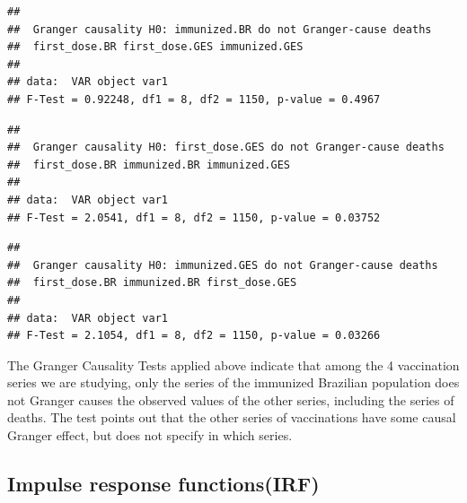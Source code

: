 \documentclass[
]{article}
\newenvironment{Shaded}{\begin{snugshade}}{\end{snugshade}}
\newcommand{\AttributeTok}[1]{\textcolor[rgb]{0.13,0.29,0.53}{#1}}
\newcommand{\CommentTok}[1]{\textcolor[rgb]{0.56,0.35,0.01}{\textit{#1}}}
\newcommand{\FunctionTok}[1]{\textcolor[rgb]{0.13,0.29,0.53}{\textbf{#1}}}
\newcommand{\NormalTok}[1]{#1}
\newcommand{\OtherTok}[1]{\textcolor[rgb]{0.56,0.35,0.01}{#1}}
\newcommand{\SpecialCharTok}[1]{\textcolor[rgb]{0.81,0.36,0.00}{\textbf{#1}}}
\newcommand{\StringTok}[1]{\textcolor[rgb]{0.31,0.60,0.02}{#1}}
\renewenvironment{Shaded}{\begin{mdframed}[ backgroundcolor=shadecolor, linecolor = shadecolor, leftmargin=\dimexpr\leftmargin-2pt\relax, innerleftmargin=1.6pt, innertopmargin=5pt, skipabove=10pt,skipbelow=3pt ]}{\end{mdframed}}
\begin{document}
\begin{verbatim}
## 
##  Granger causality H0: immunized.BR do not Granger-cause deaths
##  first_dose.BR first_dose.GES immunized.GES
## 
## data:  VAR object var1
## F-Test = 0.92248, df1 = 8, df2 = 1150, p-value = 0.4967
\end{verbatim}

\begin{Shaded}
\end{Shaded}

\begin{verbatim}
## 
##  Granger causality H0: first_dose.GES do not Granger-cause deaths
##  first_dose.BR immunized.BR immunized.GES
## 
## data:  VAR object var1
## F-Test = 2.0541, df1 = 8, df2 = 1150, p-value = 0.03752
\end{verbatim}

\begin{Shaded}
\end{Shaded}

\begin{verbatim}
## 
##  Granger causality H0: immunized.GES do not Granger-cause deaths
##  first_dose.BR immunized.BR first_dose.GES
## 
## data:  VAR object var1
## F-Test = 2.1054, df1 = 8, df2 = 1150, p-value = 0.03266
\end{verbatim}

The Granger Causality Tests applied above indicate that among the 4
vaccination series we are studying, only the series of the immunized
Brazilian population does not Granger causes the observed values of the
other series, including the series of deaths. The test points out that
the other series of vaccinations have some causal Granger effect, but
does not specify in which series.

\subsection{Impulse response
functions(IRF)}\label{impulse-response-functionsirf}
\end{document}
